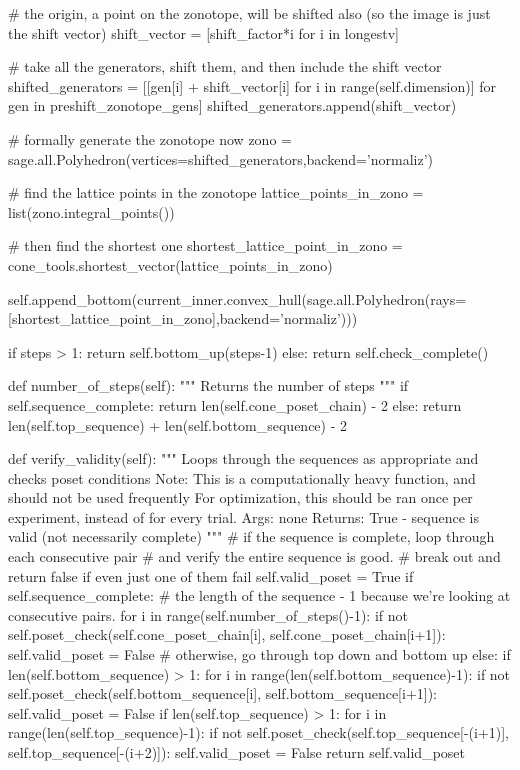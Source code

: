 \documentclass{TC}
\begin{document}
\begin{SAGE}
		# the origin, a point on the zonotope, will be shifted also (so the image is just the shift vector)
		shift_vector = [shift_factor*i for i in longestv]

		# take all the generators, shift them, and then include the shift vector
		shifted_generators = [[gen[i] + shift_vector[i] for i in range(self.dimension)] for gen in preshift_zonotope_gens]
		shifted_generators.append(shift_vector)

		# formally generate the zonotope now
		zono = sage.all.Polyhedron(vertices=shifted_generators,backend='normaliz')
		
		# find the lattice points in the zonotope
		lattice_points_in_zono = list(zono.integral_points())

		# then find the shortest one
		shortest_lattice_point_in_zono = cone_tools.shortest_vector(lattice_points_in_zono)

		self.append_bottom(current_inner.convex_hull(sage.all.Polyhedron(rays=[shortest_lattice_point_in_zono],backend='normaliz')))

		if steps > 1:
			return self.bottom_up(steps-1)
		else:
			return self.check_complete()


	def number_of_steps(self):
		""" Returns the number of steps """
		if self.sequence_complete:
			return len(self.cone_poset_chain) - 2  
		else:
			return len(self.top_sequence) + len(self.bottom_sequence) - 2 


	def verify_validity(self):
		""" Loops through the sequences as appropriate and checks poset conditions
		Note: This is a computationally heavy function, and should not be used frequently
			For optimization, this should be ran once per experiment, instead of for every trial.
		Args: none
		Returns: True - sequence is valid (not necessarily complete)
		"""
		# if the sequence is complete, loop through each consecutive pair
		# and verify the entire sequence is good.
		# break out and return false if even just one of them fail
		self.valid_poset = True
		if self.sequence_complete:
			# the length of the sequence - 1 because we're looking at consecutive pairs.
			for i in range(self.number_of_steps()-1):
				if not self.poset_check(self.cone_poset_chain[i], self.cone_poset_chain[i+1]):
					self.valid_poset = False
		# otherwise, go through top down and bottom up 
		else:
			if len(self.bottom_sequence) > 1:
				for i in range(len(self.bottom_sequence)-1):
					if not self.poset_check(self.bottom_sequence[i], self.bottom_sequence[i+1]):
						self.valid_poset = False
			if len(self.top_sequence) > 1:
				for i in range(len(self.top_sequence)-1):
					if not self.poset_check(self.top_sequence[-(i+1)], self.top_sequence[-(i+2)]):
						self.valid_poset = False
		return self.valid_poset


\end{SAGE}
\end{document}
